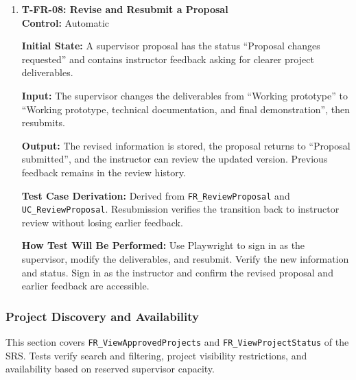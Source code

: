 \documentclass[12pt, titlepage]{article}
\begin{document}
\begin{enumerate}
\item \label{T-FR-08}\textbf{T-FR-08: Revise and Resubmit a Proposal}\\

\textbf{Control:} Automatic

\textbf{Initial State:} A supervisor proposal has the status ``Proposal changes requested'' and contains instructor feedback asking for clearer project deliverables.

\textbf{Input:} The supervisor changes the deliverables from ``Working prototype'' to ``Working prototype, technical documentation, and final demonstration'', then resubmits.

\textbf{Output:} The revised information is stored, the proposal returns to ``Proposal submitted'', and the instructor can review the updated version. Previous feedback remains in the review history.

\textbf{Test Case Derivation:} Derived from \texttt{FR\_ReviewProposal} and \texttt{UC\_ReviewProposal}. Resubmission verifies the transition back to instructor review without losing earlier feedback.

\textbf{How Test Will Be Performed:} Use Playwright to sign in as the supervisor, modify the deliverables, and resubmit. Verify the new information and status. Sign in as the instructor and confirm the revised proposal and earlier feedback are accessible.

\end{enumerate}

\subsubsection{Project Discovery and Availability}
This section covers \texttt{FR\_ViewApprovedProjects} and \texttt{FR\_ViewProjectStatus} of the SRS. Tests verify search and filtering, project visibility restrictions, and availability based on reserved supervisor capacity.
\end{document}
